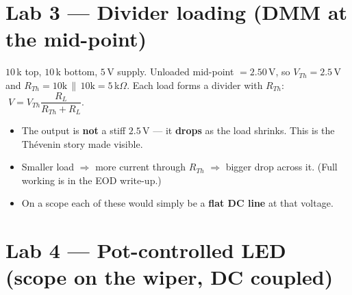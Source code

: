 \documentclass[11pt,a4paper]{article}
\begin{document}
\section*{Lab 3 --- Divider loading \hfill\normalfont\small (DMM at the mid-point)}

$10\,$k top, $10\,$k bottom, $5$\,V supply. Unloaded mid-point $=2.50$\,V, so $V_{Th}=2.5$\,V and $R_{Th}=10\text{k}\,\|\,10\text{k}=5\,$k$\Omega$.
Each load forms a divider with $R_{Th}$: $\;V = V_{Th}\dfrac{R_L}{R_{Th}+R_L}$.

\begin{center}
\end{center}

\begin{itemize}
  \item The output is \textbf{not} a stiff $2.5$\,V --- it \textbf{drops} as the load shrinks. This is the Thévenin story made visible.
  \item Smaller load $\Rightarrow$ more current through $R_{Th}$ $\Rightarrow$ bigger drop across it. (Full working is in the EOD write-up.)
  \item On a scope each of these would simply be a \textbf{flat DC line} at that voltage.
\end{itemize}

\section*{Lab 4 --- Pot-controlled LED \hfill\normalfont\small (scope on the wiper, DC coupled)}
\end{document}
